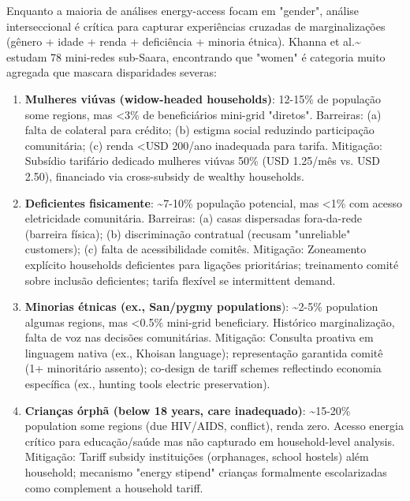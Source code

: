 \documentclass[12pt, a4paper]{article}
\begin{document}
Enquanto a maioria de análises energy-access focam em "gender", análise interseccional é crítica para capturar experiências cruzadas de marginalizações (gênero + idade + renda + deficiência + minoria étnica). Khanna et al.\textasciitilde{}\citep{Khanna2025} estudam 78 mini-redes sub-Saara, encontrando que "women" é categoria muito agregada que mascara disparidades severas:

\begin{enumerate}
\item \textbf{Mulheres viúvas (widow-headed households)}: 12-15\% de população some regions, mas <3\% de beneficiários mini-grid "diretos". Barreiras: (a) falta de colateral para crédito; (b) estigma social reduzindo participação comunitária; (c) renda <USD 200/ano inadequada para tarifa. Mitigação: Subsídio tarifário dedicado mulheres viúvas 50\% (USD 1.25/mês vs. USD 2.50), financiado via cross-subsidy de wealthy households.

\item \textbf{Deficientes fisicamente}: \textasciitilde{}7-10\% população potencial, mas <1\% com acesso eletricidade comunitária. Barreiras: (a) casas dispersadas fora-da-rede (barreira física); (b) discriminação contratual (recusam "unreliable" customers); (c) falta de acessibilidade comitês. Mitigação: Zoneamento explícito households deficientes para ligações prioritárias; treinamento comité sobre inclusão deficientes; tarifa flexível se intermittent demand.

\item \textbf{Minorias étnicas (ex., San/pygmy populations}): \textasciitilde{}2-5\% population algumas regions, mas <0.5\% mini-grid beneficiary. Histórico marginalização, falta de voz nas decisões comunitárias. Mitigação: Consulta proativa em linguagem nativa (ex., Khoisan language); representação garantida comitê (1+ minoritário assento); co-design de tariff schemes reflectindo economia específica (ex., hunting tools electric preservation).

\item \textbf{Crianças órphã (below 18 years, care inadequado)}: \textasciitilde{}15-20\% population some regions (due HIV/AIDS, conflict), renda zero. Acesso energia crítico para educação/saúde mas não capturado em household-level analysis. Mitigação: Tariff subsidy instituições (orphanages, school hostels) além household; mecanismo "energy stipend" crianças formalmente escolarizadas como complement a household tariff.
\end{enumerate}
\end{document}
